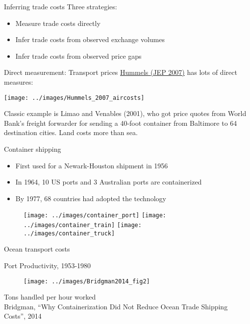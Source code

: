 \documentclass[10pt,notes=hide]{beamer}
\begin{document}
\begin{frame}{Inferring trade costs}
Three strategies:
\begin{itemize}
	\item Measure trade costs directly
	\item Infer trade costs from observed exchange volumes
	\item Infer trade costs from observed price gaps
\end{itemize}
\end{frame}
\begin{frame}{Direct measurement: Transport prices}
\href{https://www.aeaweb.org/articles?id=10.1257/jep.21.3.131}{Hummels (JEP 2007)} has lots of direct measures:
\begin{center}
\texttt{[image: ../images/Hummels\_2007\_aircosts]}
\end{center}
Classic example is Limao and Venables (2001), who got price quotes from World Bank's freight forwarder for sending a 40-foot container from Baltimore to 64 destination cities.
Land costs more than sea.
\end{frame}
\begin{frame}{Container shipping}
\begin{itemize}
	\item First used for a Newark-Houston shipment in 1956 %
	\item In 1964, 10 US ports and 3 Australian ports are containerized %
	\item By 1977, 68 countries had adopted the technology
\end{itemize}
\begin{center}\begin{figure}
	\texttt{[image: ../images/container\_port]} \hfill
	\texttt{[image: ../images/container\_train]} \hfill
	\texttt{[image: ../images/container\_truck]}
\end{figure}  \end{center}
\end{frame}
\begin{frame}{Ocean transport costs}
\begin{center} Port Productivity, 1953-1980 \begin{figure}\texttt{[image: ../images/Bridgman2014\_fig2]}\end{figure} \footnotesize{Tons handled per hour worked}\\\scriptsize{Bridgman, ``Why Containerization Did Not Reduce Ocean Trade Shipping Costs'', 2014} \end{center}
\end{frame}
\end{document}
